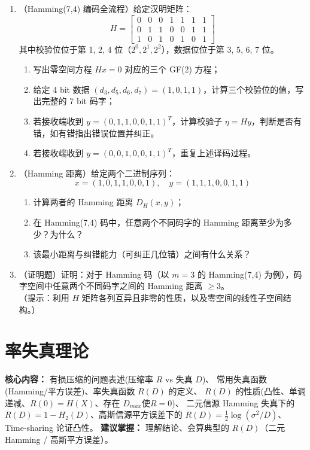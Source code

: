 \documentclass[12pt,a4paper]{ctexart}
\begin{document}
\begin{enumerate}[label=\textbf{\arabic*.}, leftmargin=*]
\item （Hamming(7,4) 编码全流程）给定汉明矩阵：
\[
H = \begin{bmatrix}
0 & 0 & 0 & 1 & 1 & 1 & 1 \\
0 & 1 & 1 & 0 & 0 & 1 & 1 \\
1 & 0 & 1 & 0 & 1 & 0 & 1
\end{bmatrix}
\]
其中校验位位于第 1, 2, 4 位（$2^0, 2^1, 2^2$），数据位位于第 3, 5, 6, 7 位。
\begin{enumerate}
  \item 写出零空间方程 $Hx = 0$ 对应的三个 GF(2) 方程；
  \item 给定 4 bit 数据 $(d_3,d_5,d_6,d_7) = (1,0,1,1)$，计算三个校验位的值，写出完整的 7 bit 码字；
  \item 若接收端收到 $y = (0,1,1,0,0,1,1)^T$，计算校验子 $\eta = Hy$，判断是否有错，如有错指出错误位置并纠正。
  \item 若接收端收到 $y = (0,0,1,0,0,1,1)^T$，重复上述译码过程。
\end{enumerate}

\item （Hamming 距离）给定两个二进制序列：
\[
x = (1,0,1,1,0,0,1),\quad y = (1,1,1,0,0,1,1)
\]
\begin{enumerate}
  \item 计算两者的 Hamming 距离 $D_H(x,y)$；
  \item 在 Hamming(7,4) 码中，任意两个不同码字的 Hamming 距离至少为多少？为什么？
  \item 该最小距离与纠错能力（可纠正几位错）之间有什么关系？
\end{enumerate}

\item （证明题）证明：对于 Hamming 码（以 $m=3$ 的 Hamming(7,4) 为例），码字空间中任意两个不同码字之间的 Hamming 距离 $\geq 3$。\\
（提示：利用 $H$ 矩阵各列互异且非零的性质，以及零空间的线性子空间结构。）
\end{enumerate}

\newpage

\section{率失真理论}

\begin{notetested}
\textbf{核心内容：} 有损压缩的问题表述(压缩率 $R$ vs 失真 $D$)、
常用失真函数(Hamming/平方误差)、率失真函数 $R(D)$ 的定义、
$R(D)$ 的性质(凸性、单调递减、$R(0)=H(X)$、存在 $D_{max}$使$R=0$)、
二元信源 Hamming 失真下的 $R(D)=1-H_2(D)$、高斯信源平方误差下的 $R(D)=\frac{1}{2}\log(\sigma^2/D)$、
Time-sharing 论证凸性。
\textbf{建议掌握：} 理解结论、会算典型的 $R(D)$（二元 Hamming / 高斯平方误差）。
\end{notetested}
\end{document}
